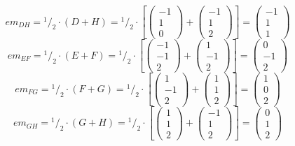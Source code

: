 \documentclass{article}
\newcommand*\rfrac[2]{{}^{#1}\!/_{#2}}%
\begin{document}
\[em_{DH}=\rfrac{1}{2}\cdot(D+H)=\rfrac{1}{2}\cdot\left[
\left({\begin{array}{c} -1 \\  1 \\ 0 \end{array}}\right)+
\left({\begin{array}{c} -1 \\  1 \\ 2 \end{array}}\right)\right]=
\left({\begin{array}{c} -1 \\ 1 \\ 1 \end{array}}\right)
\]
\[em_{EF}=\rfrac{1}{2}\cdot(E+F)=\rfrac{1}{2}\cdot\left[
\left({\begin{array}{c} -1 \\  -1 \\ 2 \end{array}}\right)+
\left({\begin{array}{c} 1 \\  -1 \\ 2 \end{array}}\right)\right]=
\left({\begin{array}{c} 0 \\ -1 \\ 2 \end{array}}\right)
\]
\[em_{FG}=\rfrac{1}{2}\cdot(F+G)=\rfrac{1}{2}\cdot\left[
\left({\begin{array}{c} 1 \\  -1 \\ 2 \end{array}}\right)+
\left({\begin{array}{c} 1 \\  1 \\ 2 \end{array}}\right)\right]=
\left({\begin{array}{c} 1 \\ 0 \\ 2 \end{array}}\right)
\]
\[em_{GH}=\rfrac{1}{2}\cdot(G+H)=\rfrac{1}{2}\cdot\left[
\left({\begin{array}{c} 1 \\  1 \\ 2 \end{array}}\right)+
\left({\begin{array}{c} -1 \\  1 \\ 2 \end{array}}\right)\right]=
\left({\begin{array}{c} 0 \\ 1 \\ 2 \end{array}}\right)
\]
\end{document}
